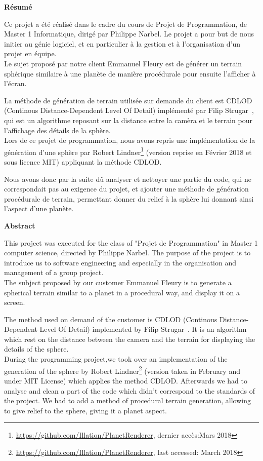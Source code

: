 {\Large
\begin{center}
    \textbf{Résumé}
\end{center}
}

Ce projet a été réalisé dans le cadre du cours de Projet de Programmation, de Master 1 Informatique, dirigé par Philippe Narbel. Le projet a pour but de nous initier au génie logiciel, et en particulier à la gestion et à l'organisation d'un projet en équipe.\\

Le sujet proposé par notre client Emmanuel Fleury est de générer un terrain sphérique similaire à une planète de manière procédurale pour ensuite l'afficher à l'écran. 

La méthode de génération de terrain utilisée sur demande du client est CDLOD (Continous Distance-Dependent Level Of Detail) implémenté par Filip Strugar~\cite{CDLOD}, qui est un algorithme reposant sur la distance entre la camèra et le terrain pour l'affichage des détails de la sphère.\\

Lors de ce projet de programmation, nous avons repris une implémentation de la génération d'une sphère par Robert Lindner\footnote{\url{https://github.com/Illation/PlanetRenderer}, dernier accès:Mars 2018} (version reprise en Février 2018 et sous licence MIT) appliquant la méthode CDLOD.

Nous avons donc par la suite dû analyser et nettoyer une partie du code, qui ne correspondait pas au exigence du projet, et ajouter une méthode de génération procédurale de terrain, permettant donner du relief à la sphère lui donnant ainsi l'aspect d'une planète. 

{\Large
\begin{center}
    \textbf{Abstract}
\end{center}
}

This project was executed for the class of "Projet de Programmation" in Master 1 computer science, directed by Philippe Narbel. The purpose of the project is to introduce us to software engineering and especially in the organisation and management of a group project.\\

The subject proposed by our customer Emmanuel Fleury is to generate a spherical terrain similar to a planet in a procedural way, and display it on a screen.

The method used on demand of the customer is CDLOD (Continous Distance-Dependent Level Of Detail) implemented by Filip Strugar~\cite{CDLOD}. It is an algorithm which rest on the distance between the camera and the terrain for displaying the details of the sphere.\\

During the programming project,we took over an implementation of the generation of the sphere by Robert Lindner\footnote{\url{https://github.com/Illation/PlanetRenderer}, last accessed: March 2018} (version taken in February and under MIT License) which applies the method CDLOD.
Afterwards we had to analyse and clean a part of the code which didn't correspond to the standards of the project. We had to add a method of procedural terrain generation, allowing to give relief to the sphere, giving it a planet aspect.